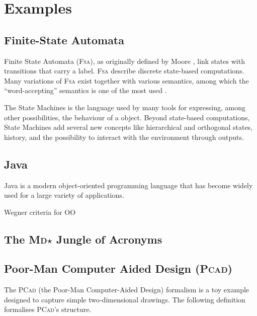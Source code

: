 \section{Examples}
\label{sec:Examples}

\subsection{Finite-State Automata}
\label{sec:Examples-FSM}

Finite State Automata (\textsc{Fsa}), as originally defined by Moore 
\cite{J:Moore:1956}, link states with transitions that carry a label. 
\textsc{Fsa} describe discrete state-based computations. Many variations of 
\textsc{Fsa} exist together with various semantics, among which the 
``word-accepting'' semantics is one of the most used \cite{}. 

The \UML State Machines \cite{TR:UML-2.5:2015} is the language used by many 
tools for expressing, among other possibilities, the behaviour of a \UML 
object. Beyond state-based computations, \UML State Machines add several new 
concepts like hierarchical and orthogonal states, history, and the possibility 
to interact with the environment through outputs.

\subsection{Java}
\label{sec:Examples-Java}

Java \cite{B:Java:2019} is a modern object-oriented programming language that 
has become widely used for a large variety of applications. 

Wegner criteria for OO \cite{Wegner:1987}

\subsection{The \textsc{Md}$\star$ Jungle of Acronyms}
\label{sec:Examples-MD}

\cite{B:Brambilla-Cabot-Wimmer:2012}


\subsection{Poor-Man Computer Aided Design (\textsc{Pcad)}}
\label{sec:Examples-PCAD}

The \textsc{PCad} (the Poor-Man Computer-Aided Design) formalism is a toy 
example designed to capture simple two-dimensional drawings. The following 
definition formalises \textsc{PCad}'s structure.


